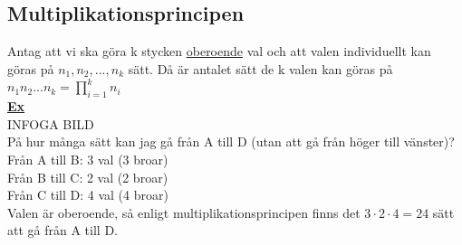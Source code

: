 \documentclass{article}
\begin{document}
        \subsection{Multiplikationsprincipen}
            Antag att vi ska göra k stycken \underline{oberoende} val och att valen individuellt kan göras på $n_{1}, n_{2}, ..., n_{k}$ sätt.
            Då är antalet sätt de k valen kan göras på $n_{1}n_{2}...n_{k}=\prod_{i=1}^{k}n_{i}$\\
            \underline{\textbf{Ex}}\\
            INFOGA BILD\\
            På hur många sätt kan jag gå från A till D (utan att gå från höger till vänster)?\\
            Från A till B: 3 val (3 broar)\\
            Från B till C: 2 val (2 broar)\\
            Från C till D: 4 val (4 broar)\\
            Valen är oberoende, så enligt multiplikationsprincipen finns det $3\cdot 2\cdot 4=24$ sätt att gå från A till D.
\end{document}
